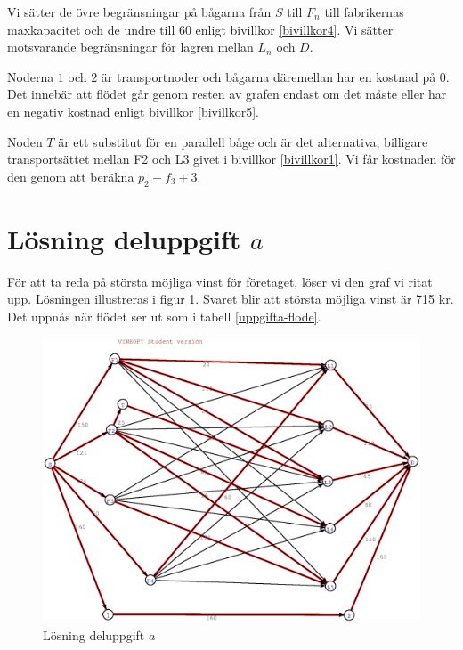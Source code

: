 \documentclass[titlepage, a4paper]{article}
\begin{document}
Vi sätter de övre begränsningar på bågarna från $S$ till $F_{n}$ till fabrikernas maxkapacitet och de undre till 60 enligt bivillkor \ref{bivillkor4}. Vi sätter motsvarande begränsningar för lagren mellan $L_{n}$ och $D$.

Noderna $1$ och $2$ är transportnoder och bågarna däremellan har en kostnad på 0. Det innebär att flödet går genom resten av grafen endast om det måste eller har en negativ kostnad enligt bivillkor \ref{bivillkor5}.

Noden $T$ är ett substitut för en parallell båge och är det alternativa, billigare transportsättet mellan F2 och L3 givet i bivillkor \ref{bivillkor1}. Vi får kostnaden för den genom att beräkna $p_{2}-f_{3}+3$.

\section{Lösning deluppgift $a$}

För att ta reda på största möjliga vinst för företaget, löser vi den graf vi ritat upp. Lösningen illustreras i figur \ref{uppgifta-losning}. Svaret blir att största möjliga vinst är 715 kr. Det uppnås när flödet ser ut som i tabell \ref{uppgifta-flode}.

\begin{figure}[h!]
\centerline{\includegraphics[scale=0.65]{laborationsuppgift_13a_solved.ps}}
\caption{Lösning deluppgift $a$} \label{uppgifta-losning}
\end{figure}
\end{document}
